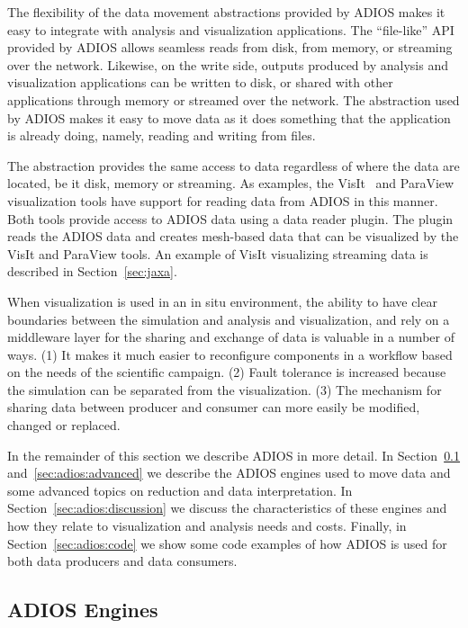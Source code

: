 \documentclass[x11names,table,xcdraw,graybox]{svmult}
\begin{document}
The flexibility of the data movement abstractions provided by ADIOS makes it easy to integrate with analysis and visualization applications. The ``file-like'' API provided by ADIOS allows seamless reads from disk, from memory, or streaming over the network.
Likewise, on the write side, outputs produced by analysis and visualization applications can be written to disk, or shared with other applications through memory or streamed over the network. The abstraction used by ADIOS makes it easy to move data as it does something that the application is already doing, namely, reading and writing from files.

The abstraction provides the same access to data regardless of where the data are located, be it disk, memory or streaming.
As examples, the  VisIt~\cite{HPV:VisIt} and ParaView~\cite{paraview} visualization tools have support for reading data from ADIOS in this manner.
Both tools provide access to ADIOS data using a data reader plugin.
The plugin reads the ADIOS data and creates mesh-based data that can be visualized by the VisIt and ParaView tools.
An example of VisIt visualizing streaming data is described in Section~\ref{sec:jaxa}.

When visualization is used in an in situ environment, the ability to have clear boundaries between the simulation and analysis and visualization, and rely on a middleware layer for the sharing and exchange of data is valuable in a number of ways.
(1) It makes it much easier to reconfigure components in a workflow based on the needs of the scientific campaign. (2) Fault tolerance is increased because the simulation can be separated from the visualization. (3) The mechanism for sharing data between producer and consumer can more easily be modified, changed or replaced.

In the remainder of this section we describe ADIOS in more detail. In Section~\ref{sec:adios:engine} and~\ref{sec:adios:advanced} we describe the ADIOS engines used to move data and some advanced topics on reduction and data interpretation.
In Section~\ref{sec:adios:discussion} we discuss the characteristics of these engines and how they relate to visualization and analysis needs and costs. Finally, in Section~\ref{sec:adios:code} we show some code examples of how ADIOS is used for both data producers and data consumers.

\subsection{ADIOS Engines}
\label{sec:adios:engine}
\end{document}
